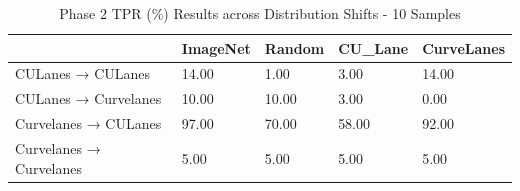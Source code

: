 \begin{table}
\caption{Phase 2 TPR (\%) Results across Distribution Shifts - 10 Samples}
\label{tab:phase2_tpr_10}
\begin{tabular}{lllll}
\toprule
 & ImageNet & Random & CU_Lane & CurveLanes \\
\midrule
CULanes → CULanes & 14.00 & 1.00 & 3.00 & 14.00 \\
CULanes → Curvelanes & 10.00 & 10.00 & 3.00 & 0.00 \\
Curvelanes → CULanes & 97.00 & 70.00 & 58.00 & 92.00 \\
Curvelanes → Curvelanes & 5.00 & 5.00 & 5.00 & 5.00 \\
\bottomrule
\end{tabular}
\end{table}
